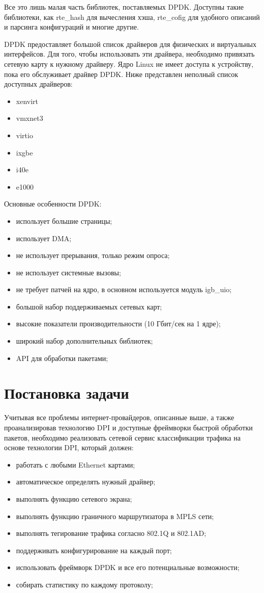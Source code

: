 Все это лишь малая часть библиотек, поставляемых DPDK. Доступны такие библиотеки, как rte\_hash для вычесления хэша, rte\_cofig для удобного описаний и парсинга конфигураций и многие другие.

DPDK предоставляет большой список драйверов для физических и виртуальных интерфейсов. Для того, чтобы использовать эти драйвера, необходимо привязать сетевую карту к нужному драйверу. Ядро Linux не имеет доступа к устройству, пока его обслуживает драйвер DPDK. Ниже представлен неполный список доступных драйверов:
\begin{itemize}
\item xenvirt
\item vmxnet3
\item virtio
\item ixgbe
\item i40e
\item e1000
\end{itemize}

Основные особенности DPDK:
\begin{itemize}
\item использует большие страницы;
\item использует DMA;
\item не использует прерывания, только режим опроса;
\item не использует системные вызовы;
\item не требует патчей на ядро, в основном используется модуль igb\_uio;
\item большой набор поддерживаемых сетевых карт;
\item высокие показатели производительности (10 Гбит/сек на 1 ядре);
\item широкий набор дополнительных библиотек;
\item API для обработки пакетами;
\end{itemize}

\section{Постановка задачи}
Учитывая все проблемы интернет-провайдеров, описанные выше, а также проанализировав технологию DPI и доступные фреймворки быстрой обработки пакетов, необходимо реализовать сетевой сервис классификации трафика на основе технологии DPI, который должен:
\begin{itemize}
\item работать с любыми Ethernet картами;
\item автоматическое определять нужный драйвер;
\item выполнять функцию сетевого экрана;
\item выполнять функцию граничного маршрутизатора в MPLS сети;
\item выполнять тегирование трафика согласно 802.1Q и 802.1AD;
\item поддерживать конфигурирование на каждый порт;
\item использовать фреймворк DPDK и все его потенциальные возможности;
\item собирать статистику по каждому протоколу;
\end{itemize}


